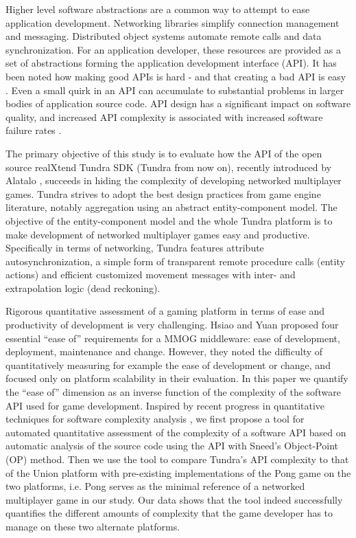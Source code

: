 \documentclass[conference]{IEEEtran}
\begin{document}
Higher level software abstractions are a common way to attempt to ease
application development. Networking libraries simplify connection
management and messaging. Distributed object systems automate remote
calls and data synchronization. For an application developer, these
resources are provided as a set of abstractions forming the
application development interface (API). It has been noted how making
good APIs is hard - and that creating a bad API is easy
\cite{api-matters}. Even a small quirk in an API can accumulate to
substantial problems in larger bodies of application source code. API
design has a significant impact on software quality, and increased API
complexity is associated with increased software failure rates
\cite{cmu-api_failures}.

The primary objective of this study is to evaluate how the API of the
open source realXtend Tundra SDK (Tundra from now on), recently
introduced by Alatalo \cite{Alatalo2011}, succeeds in hiding the complexity
of developing networked multiplayer games. Tundra strives to adopt the
best design practices from game engine literature, notably aggregation
using an abstract entity-component model. The objective of the
entity-component model and the whole Tundra platform is to make
development of networked multiplayer games easy and
productive. Specifically in terms of networking, Tundra features
attribute autosynchronization, a simple form of transparent remote
procedure calls (entity actions) and efficient customized movement
messages with inter- and extrapolation logic (dead reckoning).

Rigorous quantitative assessment of a gaming platform in terms of ease
and productivity of development is very challenging. Hsiao and Yuan
\cite{middleware} proposed four essential ``ease of'' requirements for a MMOG
middleware: ease of development, deployment, maintenance and
change. However, they noted the difficulty of quantitatively measuring
for example the ease of development or change, and focused only on
platform scalability in their evaluation. In this paper we quantify
the “ease of” dimension as an inverse function of the complexity of
the software API used for game development. Inspired by recent
progress in quantitative techniques for software complexity analysis
\cite{api-complexity-analysis,cmu-api_failures}, we first propose a tool
for automated quantitative assessment of the complexity of a software
API based on automatic analysis of the source code using the API with
Sneed’s Object-Point (OP) method. Then we use the tool to compare
Tundra’s API complexity to that of the Union platform with
pre-existing implementations of the Pong game on the two platforms,
i.e. Pong serves as the minimal reference of a networked multiplayer
game in our study. Our data shows that the tool indeed successfully
quantifies the different amounts of complexity that the game developer
has to manage on these two alternate platforms.
\end{document}
